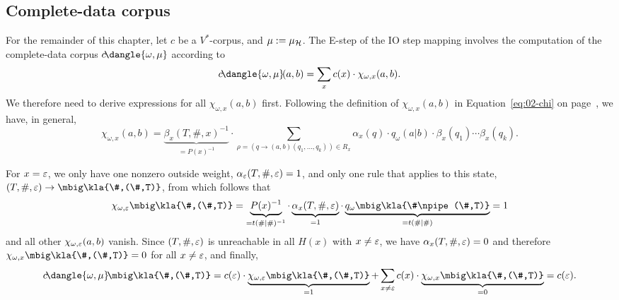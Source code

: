 \subsection{Complete-data corpus}

For the remainder of this chapter, let $c$ be a $V^*$-corpus, and
$\mu:=\mu_\mathcal H$. The E-step of the IO step mapping involves the computation of
the complete-data corpus $c\!\dangle{\omega,\mu}$ according to
\[
 c\!\dangle{\omega,\mu}\!(a,b) = \sum_x c(x) \cdot \chi_{\omega,x}(a,b).
\]
We therefore need to derive expressions for all $\chi_{\omega,x}(a,b)$ first.
Following the definition of $\chi_{\omega,x}(a,b)$ in
Equation~\eqref{eq:02-chi} on page~\pageref{eq:02-chi}, we have, in general,
\begin{equation}\label{eq:03-chi}
 \chi_{\omega,x}(a,b) = \underbrace{\beta_x(T,\#,x)^{-1}}_{=P(x)^{-1}} \cdot \sum_{\rho = (q\to(a,b)(q_1,\ldots,q_k))\in R_x} \alpha_x(q) \cdot q_\omega(a|b) \cdot \beta_x(q_1) \cdots \beta_x(q_k).
\end{equation}

For $x=\varepsilon$, we only have one nonzero outside weight, $\alpha_\varepsilon(T,\#,\varepsilon)
= 1$, and only one rule that applies to this state, $(T,\#,\eps) \to
\mbig\kla{\#,(\#,T)}$, from which follows that
\[
 \chi_{\omega,\eps}\mbig\kla{\#,(\#,T)} = \underbrace{P(x)^{-1}}_{=t(\#|\#)^{-1}} \cdot \underbrace{\alpha_x(T,\#,\eps)}_{=1} \cdot \underbrace{q_\omega\mbig\kla{\#\npipe(\#,T)}}_{=t(\#|\#)} = 1
\]
and all other $\chi_{\omega,\varepsilon}(a,b)$ vanish. Since $(T,\#,\varepsilon)$ is
unreachable in all $H(x)$ with $x\neq\varepsilon$, we have $\alpha_x(T,\#,\varepsilon) = 0$
and therefore $\chi_{\omega,x}\mbig\kla{\#,(\#,T)}=0$ for all $x\neq\varepsilon$, and finally,
\[
 c\!\dangle{\omega,\mu}\!\mbig\kla{\#,(\#,T)} = c(\eps) \cdot \underbrace{\chi_{\omega,\eps}\mbig\kla{\#,(\#,T)}}_{=1} + \sum_{x\neq\eps} c(x) \cdot \underbrace{\chi_{\omega,x}\mbig\kla{\#,(\#,T)}}_{=0} = c(\eps).
\]

